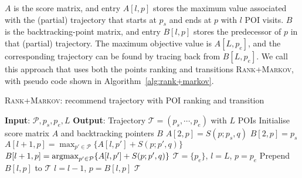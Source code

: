 $A$ is the score matrix, and entry $A[l, p]$ stores the maximum value associated with the (partial) trajectory
that starts at $p_s$ and ends at $p$ with $l$ POI visits.
$B$ is the backtracking-point matrix, and entry $B[l, p]$ stores the predecessor of $p$ in that (partial) trajectory.
The maximum objective value is $A[L, p_e]$,
and the corresponding trajectory can be found by tracing back from $B[L, p_e]$.
We call this approach that uses both the points ranking and transitions \textsc{Rank+Markov},
with pseudo code shown in Algorithm~\ref{alg:rank+markov}.

\setlength{\textfloatsep}{0.5em} %

\begin{algorithm}[t]
\caption{\textsc{Rank+Markov}: recommend trajectory with POI ranking and transition}
\label{alg:rank+markov}
\begin{algorithmic}[1]
\STATE \textbf{Input}: $\mathcal{P}, p_s, p_e, L$
\STATE \textbf{Output}: Trajectory $\mathcal{T} = (p_s, \cdots, p_e)$ with $L$ POIs
\STATE Initialise score matrix $A$ and backtracking pointers $B$
    \STATE $A[2, p] = S(p; p_s, q)$
    \STATE $B[2, p] = p_s$
\ENDFOR
{}
        \STATE $A[l+1, p]   = \max_{p' \in \mathcal{P}} \{ A[l, p'] + S(p; p', q) \}$ \label{eq:max}
        \STATE $B[l+1, p]   = \operatorname*{argmax}_{p' \in \mathcal{P}} \{ A[l, p'] + S(p; p', q) \}$ \label{eq:argmax}
    \ENDFOR
\ENDFOR
\STATE $\mathcal{T}= \{p_e\}$, $l = L$, $p = p_e$
\REPEAT
    \STATE Prepend $B[l, p]$ to $\mathcal{T}$
    \STATE $l = l - 1$, $p = B[l, p]$
\RETURN $\mathcal{T}$
\end{algorithmic}
\end{algorithm}



